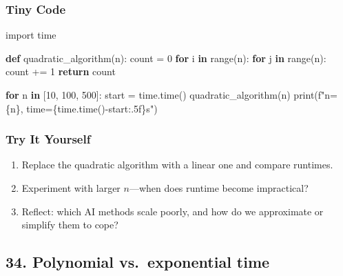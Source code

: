 \documentclass[
  letterpaper,
  DIV=11,
  numbers=noendperiod]{scrreprt}
\newenvironment{Shaded}{\begin{snugshade}}{\end{snugshade}}
\newcommand{\BuiltInTok}[1]{\textcolor[rgb]{0.00,0.23,0.31}{#1}}
\newcommand{\ControlFlowTok}[1]{\textcolor[rgb]{0.00,0.23,0.31}{\textbf{#1}}}
\newcommand{\DecValTok}[1]{\textcolor[rgb]{0.68,0.00,0.00}{#1}}
\newcommand{\ImportTok}[1]{\textcolor[rgb]{0.00,0.46,0.62}{#1}}
\newcommand{\KeywordTok}[1]{\textcolor[rgb]{0.00,0.23,0.31}{\textbf{#1}}}
\newcommand{\NormalTok}[1]{\textcolor[rgb]{0.00,0.23,0.31}{#1}}
\newcommand{\OperatorTok}[1]{\textcolor[rgb]{0.37,0.37,0.37}{#1}}
\newcommand{\SpecialCharTok}[1]{\textcolor[rgb]{0.37,0.37,0.37}{#1}}
\newcommand{\SpecialStringTok}[1]{\textcolor[rgb]{0.13,0.47,0.30}{#1}}
\providecommand{\tightlist}{%
  \setlength{\itemsep}{0pt}\setlength{\parskip}{0pt}}
\begin{document}
\subsubsection{Tiny Code}\label{tiny-code-32}

\begin{Shaded}
\begin{Highlighting}[]
\ImportTok{import}\NormalTok{ time}

\KeywordTok{def}\NormalTok{ quadratic\_algorithm(n):}
\NormalTok{    count }\OperatorTok{=} \DecValTok{0}
    \ControlFlowTok{for}\NormalTok{ i }\KeywordTok{in} \BuiltInTok{range}\NormalTok{(n):}
        \ControlFlowTok{for}\NormalTok{ j }\KeywordTok{in} \BuiltInTok{range}\NormalTok{(n):}
\NormalTok{            count }\OperatorTok{+=} \DecValTok{1}
    \ControlFlowTok{return}\NormalTok{ count}

\ControlFlowTok{for}\NormalTok{ n }\KeywordTok{in}\NormalTok{ [}\DecValTok{10}\NormalTok{, }\DecValTok{100}\NormalTok{, }\DecValTok{500}\NormalTok{]:}
\NormalTok{    start }\OperatorTok{=}\NormalTok{ time.time()}
\NormalTok{    quadratic\_algorithm(n)}
    \BuiltInTok{print}\NormalTok{(}\SpecialStringTok{f"n=}\SpecialCharTok{\{}\NormalTok{n}\SpecialCharTok{\}}\SpecialStringTok{, time=}\SpecialCharTok{\{}\NormalTok{time}\SpecialCharTok{.}\NormalTok{time()}\OperatorTok{{-}}\NormalTok{start}\SpecialCharTok{:.5f\}}\SpecialStringTok{s"}\NormalTok{)}
\end{Highlighting}
\end{Shaded}

\subsubsection{Try It Yourself}\label{try-it-yourself-32}

\begin{enumerate}
\def\labelenumi{\arabic{enumi}.}
\tightlist
\item
  Replace the quadratic algorithm with a linear one and compare
  runtimes.
\item
  Experiment with larger \(n\)---when does runtime become impractical?
\item
  Reflect: which AI methods scale poorly, and how do we approximate or
  simplify them to cope?
\end{enumerate}

\subsection{34. Polynomial vs.~exponential
time}\label{polynomial-vs.-exponential-time}
\end{document}
